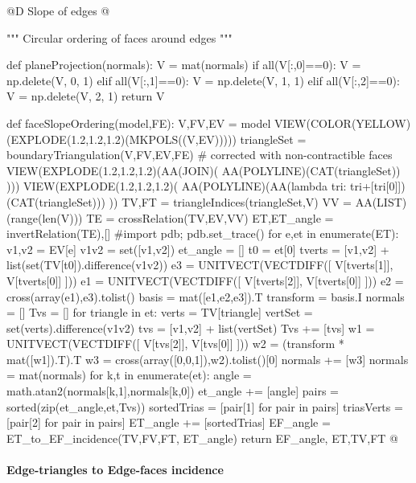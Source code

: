 \documentclass[11pt,oneside]{article}    %
\begin{document}
@D Slope of edges
@{""" Circular ordering of faces around edges """

def planeProjection(normals):
    V = mat(normals)
    if all(V[:,0]==0): V = np.delete(V, 0, 1)
    elif all(V[:,1]==0): V = np.delete(V, 1, 1)
    elif all(V[:,2]==0): V = np.delete(V, 2, 1)
    return V

def faceSlopeOrdering(model,FE):
    V,FV,EV = model
    VIEW(COLOR(YELLOW)(EXPLODE(1.2,1.2,1.2)(MKPOLS((V,EV)))))
    triangleSet = boundaryTriangulation(V,FV,EV,FE) # corrected with non-contractible faces
    VIEW(EXPLODE(1.2,1.2,1.2)(AA(JOIN)( AA(POLYLINE)(CAT(triangleSet)) )))
    VIEW(EXPLODE(1.2,1.2,1.2)( AA(POLYLINE)(AA(lambda tri: tri+[tri[0]])(CAT(triangleSet))) ))
    TV,FT = triangleIndices(triangleSet,V) 
    VV = AA(LIST)(range(len(V)))
    TE = crossRelation(TV,EV,VV)
    ET,ET_angle = invertRelation(TE),[]
    #import pdb; pdb.set_trace()
    for e,et in enumerate(ET):
        v1,v2 = EV[e]
        v1v2 = set([v1,v2])
        et_angle = []
        t0 = et[0]
        tverts = [v1,v2] + list(set(TV[t0]).difference(v1v2))
        e3 = UNITVECT(VECTDIFF([ V[tverts[1]], V[tverts[0]] ]))
        e1 = UNITVECT(VECTDIFF([ V[tverts[2]], V[tverts[0]] ]))
        e2 = cross(array(e1),e3).tolist()
        basis = mat([e1,e2,e3]).T
        transform = basis.I
        normals = []
        Tvs = []
        for triangle in et:
            verts = TV[triangle]
            vertSet = set(verts).difference(v1v2)
            tvs = [v1,v2] + list(vertSet)
            Tvs += [tvs]
            w1 = UNITVECT(VECTDIFF([ V[tvs[2]], V[tvs[0]] ]))
            w2 = (transform * mat([w1]).T).T
            w3 = cross(array([0,0,1]),w2).tolist()[0]
            normals += [w3]
        normals = mat(normals)
        for k,t in enumerate(et):
            angle = math.atan2(normals[k,1],normals[k,0])
            et_angle += [angle]
        pairs = sorted(zip(et_angle,et,Tvs))
        sortedTrias = [pair[1] for pair in pairs]
        triasVerts = [pair[2] for pair in pairs]
        ET_angle += [sortedTrias]
    EF_angle = ET_to_EF_incidence(TV,FV,FT, ET_angle)
    return EF_angle, ET,TV,FT
@}



\paragraph{Edge-triangles to Edge-faces incidence}
\end{document}
